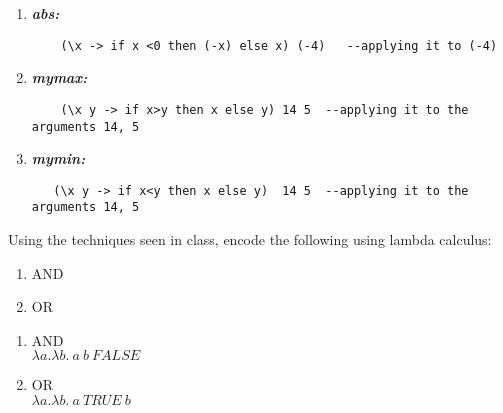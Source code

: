 \documentclass{article}
\begin{document}
\begin{Answer}
  \begin{enumerate}
    \item \textbf{\textit{abs:}}
  \begin{lstlisting}
    (\x -> if x <0 then (-x) else x) (-4)   --applying it to (-4)
  \end{lstlisting}

  \item \textbf{\textit{mymax:}}
  \begin{lstlisting}
    (\x y -> if x>y then x else y) 14 5  --applying it to the arguments 14, 5
  \end{lstlisting}

  \item \textbf{\textit{mymin:}}
  \begin{lstlisting}
   (\x y -> if x<y then x else y)  14 5  --applying it to the arguments 14, 5
  \end{lstlisting}

\end{enumerate}
\end{Answer}
\begin{Exercise}
Using the techniques seen in class, encode the following using lambda calculus:
\begin{enumerate}
    \item AND 
    \item OR 
\end{enumerate}
\end{Exercise}
\begin{Answer}
  \begin{enumerate}
    \item AND \\
    $\lambda a. \lambda b. \ a \ b \ FALSE$
    \item OR \\
    $\lambda a. \lambda b. \ a \ TRUE \ b  $
\end{enumerate}

\end{Answer}
\end{document}
